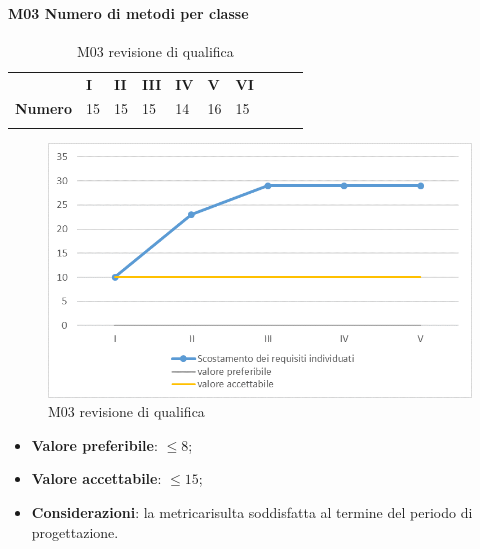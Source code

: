 \paragraph{M03 Numero di metodi per classe} \mbox{}
\begin{longtable}[H!] {						
		>{}p{50mm}  		
		>{}p{8mm}
		>{}p{8mm}		
		>{}p{8mm}		
		>{}p{8mm}		
		>{}p{8mm}		
		>{}p{8mm}
		>{}p{8mm}
		>{}p{8mm}
		>{}p{8mm}
	}
	\rowcolor{gray!50}
	\textbf{} & \textbf{I} & \textbf{II} & \textbf{III} & \textbf{IV} & \textbf{V} & \textbf{VI} \TBstrut \\ [2mm]
	\textbf{Numero} & 15 & 15 & 15 & 14 & 16 & 15 \TBstrut \\ [2mm]
	\rowcolor{white}
	\caption{M03 revisione di qualifica}
\end{longtable}
\begin{figure}[H] 	
	\includegraphics[width=\linewidth]{./img/grafici/RP1.png}	
	\caption{M03 revisione di qualifica}	
\end{figure}
\begin{itemize}
	\item \textbf{Valore preferibile}: $\le 8$;
	\item \textbf{Valore accettabile}: $\le 15$;
	\item \textbf{Considerazioni}: la metrica\glosp risulta soddisfatta al termine del periodo di progettazione\glo.
\end{itemize}

